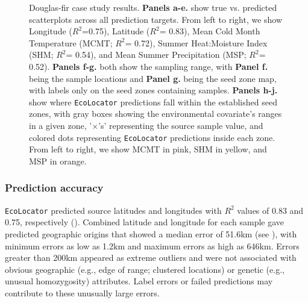\documentclass[]{article}
\newcommand{\dfir}{Douglas-fir\xspace}
\newcommand{\ecolocator}{\texttt{EcoLocator}\xspace}
\begin{document}
\begin{figure}[H]
    \caption{\dfir case study results. \textbf{Panels a-e.} show true
    vs. predicted scatterplots across all prediction targets. From left to right,
    we show Longitude ($R^2$=0.75), Latitude ($R^2$= 0.83), 
    Mean Cold Month Temperature (MCMT; $R^2$= 0.72), Summer Heat:Moisture Index 
    (SHM; $R^2$= 0.54), and Mean Summer Precipitation (MSP; $R^2$= 0.52).
    \textbf{Panels f-g.}
    both show the sampling range, with \textbf{Panel f.} being the sample locations
    and \textbf{Panel g.} being the seed zone map, with labels only on the seed 
    zones containing samples.
    \textbf{Panels h-j.} show where \ecolocator predictions fall within the 
    established seed zones, with gray boxes showing the environmental covariate's ranges in a
    given zone, '$\times$'s' representing the source sample value, and colored dots representing \ecolocator 
    predictions inside each zone. From left to right, we show MCMT in pink, SHM 
    in yellow, and MSP in orange. 
    }
    \label{fig:dfir-results}
\end{figure}


\subsubsection*{Prediction accuracy}

\ecolocator predicted source latitudes and longitudes with $R^2$
values of 0.83 and 0.75, respectively (). Combined latitude
and longitude for each sample gave predicted geographic origins that showed a median error of 51.6km (see ), with
minimum errors as low as 1.2km and maximum errors as high as 646km. Errors
greater than 200km appeared as extreme outliers and were not associated with obvious
geographic (e.g., edge of range; clustered locations) or genetic (e.g., unusual homozygosity)
attributes. Label errors or failed predictions may contribute to these unusually large errors. 
\end{document}
